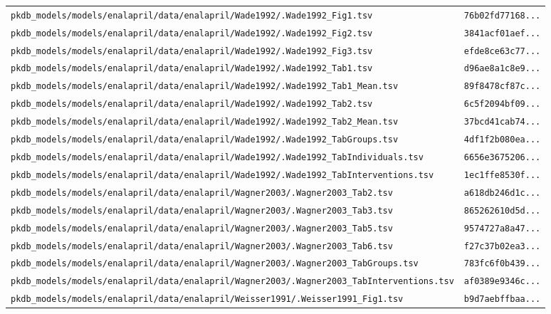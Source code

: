 \begin{longtable}{ll}
\texttt{pkdb\_models/models/enalapril/data/enalapril/Wade1992/.Wade1992\_Fig1.tsv} & \texttt{76b02fd77168...} \\
\texttt{pkdb\_models/models/enalapril/data/enalapril/Wade1992/.Wade1992\_Fig2.tsv} & \texttt{3841acf01aef...} \\
\texttt{pkdb\_models/models/enalapril/data/enalapril/Wade1992/.Wade1992\_Fig3.tsv} & \texttt{efde8ce63c77...} \\
\texttt{pkdb\_models/models/enalapril/data/enalapril/Wade1992/.Wade1992\_Tab1.tsv} & \texttt{d96ae8a1c8e9...} \\
\texttt{pkdb\_models/models/enalapril/data/enalapril/Wade1992/.Wade1992\_Tab1\_Mean.tsv} & \texttt{89f8478cf87c...} \\
\texttt{pkdb\_models/models/enalapril/data/enalapril/Wade1992/.Wade1992\_Tab2.tsv} & \texttt{6c5f2094bf09...} \\
\texttt{pkdb\_models/models/enalapril/data/enalapril/Wade1992/.Wade1992\_Tab2\_Mean.tsv} & \texttt{37bcd41cab74...} \\
\texttt{pkdb\_models/models/enalapril/data/enalapril/Wade1992/.Wade1992\_TabGroups.tsv} & \texttt{4df1f2b080ea...} \\
\texttt{pkdb\_models/models/enalapril/data/enalapril/Wade1992/.Wade1992\_TabIndividuals.tsv} & \texttt{6656e3675206...} \\
\texttt{pkdb\_models/models/enalapril/data/enalapril/Wade1992/.Wade1992\_TabInterventions.tsv} & \texttt{1ec1ffe8530f...} \\
\texttt{pkdb\_models/models/enalapril/data/enalapril/Wagner2003/.Wagner2003\_Tab2.tsv} & \texttt{a618db246d1c...} \\
\texttt{pkdb\_models/models/enalapril/data/enalapril/Wagner2003/.Wagner2003\_Tab3.tsv} & \texttt{865262610d5d...} \\
\texttt{pkdb\_models/models/enalapril/data/enalapril/Wagner2003/.Wagner2003\_Tab5.tsv} & \texttt{9574727a8a47...} \\
\texttt{pkdb\_models/models/enalapril/data/enalapril/Wagner2003/.Wagner2003\_Tab6.tsv} & \texttt{f27c37b02ea3...} \\
\texttt{pkdb\_models/models/enalapril/data/enalapril/Wagner2003/.Wagner2003\_TabGroups.tsv} & \texttt{783fc6f0b439...} \\
\texttt{pkdb\_models/models/enalapril/data/enalapril/Wagner2003/.Wagner2003\_TabInterventions.tsv} & \texttt{af0389e9346c...} \\
\texttt{pkdb\_models/models/enalapril/data/enalapril/Weisser1991/.Weisser1991\_Fig1.tsv} & \texttt{b9d7aebffbaa...} \\

\end{longtable}
